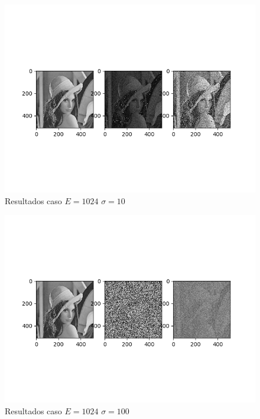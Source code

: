 \begin{figure}
\includegraphics[scale=0.9]{Imagenes/E1024S10}
\centering
\caption{Resultados caso $E=1024$ $\sigma = 10$ }
\end{figure}

\begin{figure}
\includegraphics[scale=0.9]{Imagenes/E1024S100}
\centering
\caption{Resultados caso $E=1024$ $\sigma = 100$ }
\end{figure}

%
